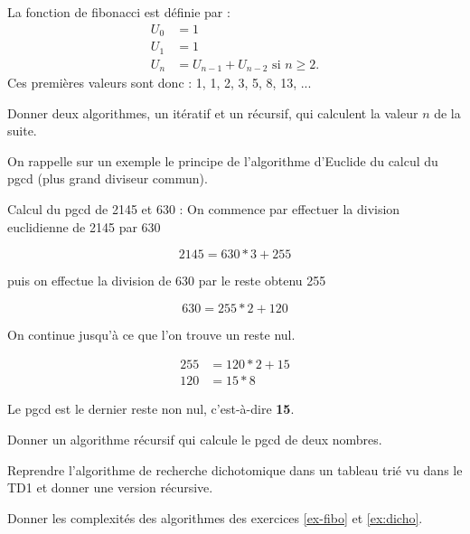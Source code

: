 \documentclass{../cours}
\begin{document}
\begin{exercice}
\label{ex-fibo}
La fonction de fibonacci est définie par :
\begin{align*}
U_0 &= 1 \\
U_1 &= 1 \\
U_n &= U_{n-1} + U_{n-2} \text{ si }n \geq 2.
\end{align*}
Ces premières valeurs sont donc : 1, 1, 2, 3, 5, 8, 13, ...

Donner deux algorithmes, un itératif et un récursif, qui calculent la valeur $n$ de la suite.

\end{exercice}

\begin{exercice}
On rappelle sur un exemple le principe de l'algorithme d'Euclide du calcul du pgcd (plus grand diviseur commun). 

Calcul du pgcd de 2145 et 630 : On commence par effectuer la division euclidienne de 2145 par 630

\begin{equation*}
2145 = 630 * 3 + 255
\end{equation*}

puis on effectue la division de 630 par le reste obtenu 255

\begin{equation*}
630 = 255 * 2 + 120
\end{equation*}

On continue jusqu'à ce que l'on trouve un reste nul.

\begin{align*}
255 &= 120 *2 + 15 \\
120 &= 15 * 8
\end{align*}

Le pgcd est le dernier reste non nul, c'est-à-dire \textbf{15}.

Donner un algorithme récursif qui calcule le pgcd de deux nombres.
\end{exercice}

\begin{exercice}
\label{ex:dicho}
Reprendre l'algorithme de recherche dichotomique dans un tableau trié vu dans le TD1 et donner une version récursive.
\end{exercice}

\begin{exercice}
Donner les complexités des algorithmes des exercices \ref{ex-fibo} et \ref{ex:dicho}.
\end{exercice}
\end{document}
